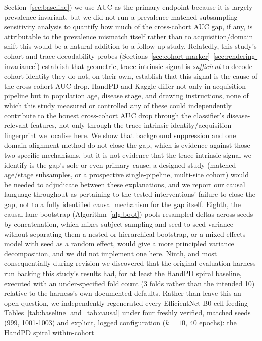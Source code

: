 \documentclass[3p,final,10pt]{elsarticle}
\begin{document}
Section~\ref{sec:baseline}) we use AUC as the primary endpoint because it
is largely prevalence-invariant, but we did not run a prevalence-matched
subsampling sensitivity analysis to quantify how much of the cross-cohort
AUC gap, if any, is attributable to the prevalence mismatch itself rather
than to acquisition/domain shift this would be a natural addition to a
follow-up study. Relatedly, this study's cohort and trace-decodability
probes (Sections~\ref{sec:cohort-marker}--\ref{sec:rendering-invariance})
establish that geometric, trace-intrinsic signal is \emph{sufficient} to
decode cohort identity they do not, on their own, establish that this
signal is the cause of the cross-cohort AUC drop. HandPD and Kaggle
differ not only in acquisition pipeline but in population age, disease
stage, and drawing instructions, none of which this study measured or
controlled any of these could independently contribute to the honest
cross-cohort AUC drop through the classifier's disease-relevant features,
not only through the trace-intrinsic identity/acquisition fingerprint we
localise here. We show that background suppression and one domain-alignment
method do not close the gap, which is evidence against those two specific
mechanisms, but it is not evidence that the trace-intrinsic signal we
identify is the gap's sole or even primary cause; a designed study
(matched age/stage subsamples, or a prospective single-pipeline, multi-site
cohort) would be needed to adjudicate between these explanations, and we
report our causal language throughout as pertaining to the tested
interventions' failure to close the gap, not to a fully identified causal
mechanism for the gap itself. Eighth, the causal-lane bootstrap (Algorithm~\ref{alg:boot})
pools resampled deltas across seeds by concatenation, which mixes
subject-sampling and seed-to-seed variance without separating them a
nested or hierarchical bootstrap, or a mixed-effects model with seed as a
random effect, would give a more principled variance decomposition, and we
did not implement one here. Ninth, and most consequentially during
revision we discovered that the original evaluation harness run backing
this study's results had, for at least the HandPD spiral baseline,
executed with an under-specified fold count (3 folds rather than the
intended 10) relative to the harness's own documented defaults. Rather
than leave this an open question, we independently regenerated every
EfficientNet-B0 cell feeding Tables~\ref{tab:baseline} and~\ref{tab:causal}
under four freshly verified, matched seeds (999, 1001-1003) and explicit,
logged configuration ($k{=}10$, 40 epochs): the HandPD spiral within-cohort
\end{document}
